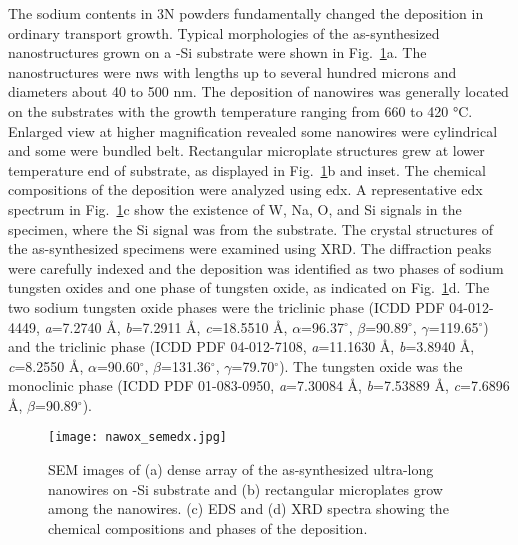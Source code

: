 The sodium contents in 3N powders fundamentally changed the deposition in ordinary transport growth. Typical morphologies of the as-synthesized nanostructures grown on a -Si substrate were shown in Fig.~\ref{fig:nawoxsemedx}a. The nanostructures were \glspl{nw} with lengths up to several hundred microns and diameters about 40 to 500 nm. The deposition of nanowires was generally located on the substrates with the growth temperature ranging from 660 to 420 \si{\degreeCelsius}. Enlarged view at higher magnification revealed some nanowires were cylindrical and some were bundled belt. Rectangular microplate structures grew at lower temperature end of substrate, as displayed in Fig.~\ref{fig:nawoxsemedx}b and inset. The chemical compositions of the deposition were analyzed using \gls{edx}. A representative \gls{edx} spectrum in Fig.~\ref{fig:nawoxsemedx}c show the existence of W, Na, O, and Si signals in the specimen, where the Si signal was from the substrate. The crystal structures of the as-synthesized specimens were examined using XRD. The diffraction peaks were carefully indexed and the deposition was identified as two phases of sodium tungsten oxides and one phase of tungsten oxide, as indicated on Fig.~\ref{fig:nawoxsemedx}d. The two sodium tungsten oxide phases were the triclinic  phase (ICDD PDF 04-012-4449, \emph{a}=7.2740 \si{\angstrom}, \emph{b}=7.2911 \si{\angstrom}, \emph{c}=18.5510 \si{\angstrom}, $\alpha$=96.37$^\circ$, $\beta$=90.89$^\circ$, $\gamma$=119.65$^\circ$) and the triclinic  phase (ICDD PDF 04-012-7108, \emph{a}=11.1630 \si{\angstrom}, \emph{b}=3.8940 \si{\angstrom}, \emph{c}=8.2550 \si{\angstrom}, $\alpha$=90.60$^\circ$, $\beta$=131.36$^\circ$, $\gamma$=79.70$^\circ$). The tungsten oxide was the monoclinic  phase (ICDD PDF 01-083-0950, \emph{a}=7.30084 \si{\angstrom}, \emph{b}=7.53889 \si{\angstrom}, \emph{c}=7.6896 \si{\angstrom}, $\beta$=90.89$^\circ$).

\begin{figure}[htb]
\centering
\texttt{[image: nawox\_semedx.jpg]}
\caption[SEM, EDX and XRD on sodium tungsten oxides sample]{SEM images of (a) dense array of the as-synthesized ultra-long nanowires on -Si substrate and (b) rectangular microplates grow among the nanowires. (c) EDS and (d) XRD spectra showing the chemical compositions and phases of the deposition.}
\label{fig:nawoxsemedx}
\end{figure}

